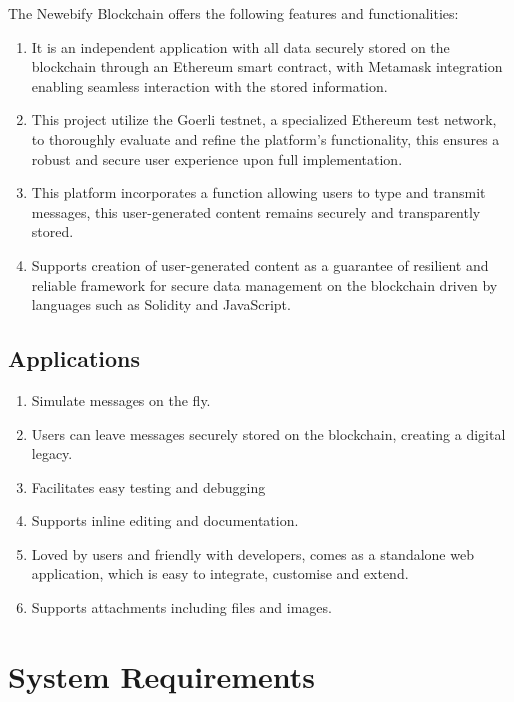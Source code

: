 \documentclass[12pt,a4paper]{article}
\begin{document}
The Newebify Blockchain offers the following features and functionalities:
\begin{enumerate}
	\item It is an independent application with all data securely stored on the blockchain through an Ethereum smart contract, with Metamask integration enabling seamless interaction with the stored information.
	\item  This project utilize the Goerli testnet, a specialized Ethereum test network, to thoroughly evaluate and refine the platform's functionality, this ensures a robust and secure user experience upon full implementation.
	\item This platform incorporates a function allowing users to type and transmit messages, this user-generated content remains securely and transparently stored.
	\item Supports creation of user-generated content as a guarantee of resilient and reliable framework for secure data management on the blockchain driven by languages such as Solidity and JavaScript.
\end{enumerate}

\subsection{Applications}
\begin{enumerate}
\item Simulate messages on the fly.
\item Users can leave messages securely stored on the blockchain, creating a digital legacy.
\item Facilitates easy testing and debugging
\item Supports inline editing and documentation.
\item Loved by users and friendly with developers, comes as a standalone web application, which is easy to integrate, customise and extend.
\item Supports attachments including files and images.
\end{enumerate}
\newpage

\section{System Requirements}
\end{document}

